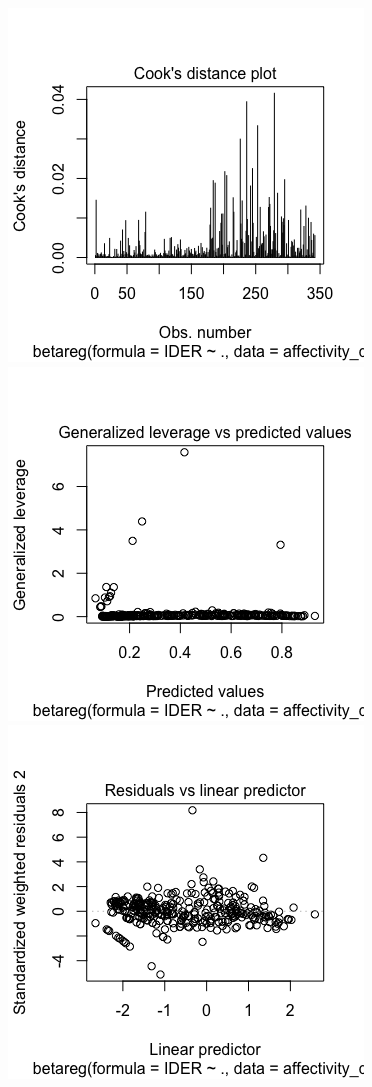\documentclass[
  letterpaper,
  DIV=11,
  numbers=noendperiod]{scrartcl}
\begin{document}
\includegraphics{assumption_plots/cook.png}
\includegraphics{assumption_plots/leverage.png}
\includegraphics{assumption_plots/linear.png}
\end{document}
